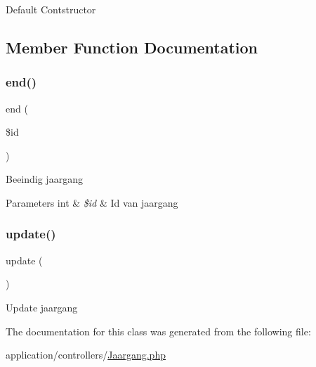 Default Contstructor 

\subsection{Member Function Documentation}
\mbox{\label{class_jaargang_a96b12cad9ede16ef3e87c74cf77b894b}} 
\subsubsection{\texorpdfstring{end()}{end()}}
{\footnotesize\ttfamily end (\begin{DoxyParamCaption}\item[{}]{\$id }\end{DoxyParamCaption})}

Beeindig jaargang 
\begin{DoxyParams}[1]{Parameters}
int & {\em \$id} & Id van jaargang \\
\hline
\end{DoxyParams}
\mbox{\label{class_jaargang_a842e4774e3b3601a005b995c02f7e883}} 
\subsubsection{\texorpdfstring{update()}{update()}}
{\footnotesize\ttfamily update (\begin{DoxyParamCaption}{ }\end{DoxyParamCaption})}

Update jaargang 

The documentation for this class was generated from the following file\+:\begin{DoxyCompactItemize}
\item 
application/controllers/\mbox{\hyperlink{_jaargang_8php}{Jaargang.\+php}}\end{DoxyCompactItemize}
